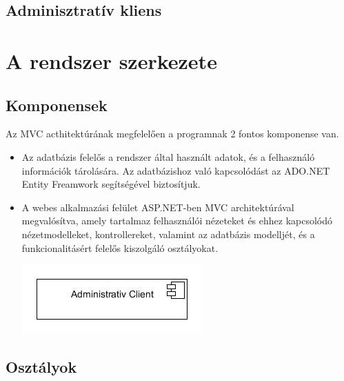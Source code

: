 \documentclass[12pt,a4paper]{article}
\begin{document}
\subsection{Adminisztratív kliens}


\section{A rendszer szerkezete}
\subsection{Komponensek}
Az MVC acthitektúrának megfelelően a programnak 2 fontos komponense van.
\begin{itemize}
\item Az adatbázis felelős a rendszer által használt adatok, és a felhasználó információk tárolására. Az adatbázishoz való kapcsolódást az ADO.NET Entity Freamwork segítségével biztosítjuk.
\item A webes alkalmazási felület ASP.NET-ben MVC architektúrával megvalósítva, amely tartalmaz felhasználói nézeteket és ehhez kapcsolódó nézetmodelleket, kontrollereket, valamint az adatbázis modelljét, és a funkcionalitásért felelős kiszolgáló osztályokat.

\includegraphics[scale=0.5]{komponens_diagram.jpg}

\end{itemize}
\subsection{Osztályok}
\end{document}

